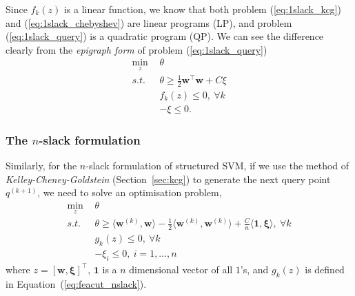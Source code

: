 \documentclass[9pt]{extarticle}
\begin{document}
Since $f_k(z)$ is a linear function, we know that both problem (\ref{eq:1slack_kcg}) and (\ref{eq:1slack_chebyshev}) are linear programs (LP),
and problem (\ref{eq:1slack_query}) is a quadratic program (QP). 
We can see the difference clearly from the \emph{epigraph form} of problem (\ref{eq:1slack_query}) 
\begin{align*}
\min_{z} ~& \theta \\
s.t.~~ ~& \theta \ge \frac{1}{2} \mathbf{w}^\top \mathbf{w} + C \xi \\
        & f_k(z) \le 0,~ \forall k \\
        & -\xi \le 0.
\end{align*}


\subsubsection{The $n$-slack formulation}
\label{sec:compare_nslack}

Similarly, for the $n$-slack formulation of structured SVM,
if we use the method of \emph{Kelley-Cheney-Goldstein} (Section~\ref{sec:kcg}) to generate the next query point $q^{(k+1)}$,
we need to solve an optimisation problem,
\begin{equation}
\label{eq:nslack_kcg}
\begin{aligned}
\min_{z} ~& \theta \\
s.t.~~ ~& \theta \ge \langle \mathbf{w}^{(k)}, \mathbf{w} \rangle - \frac{1}{2} \langle \mathbf{w}^{(k)}, \mathbf{w}^{(k)} \rangle + 
\frac{C}{n} \langle \mathbf{1}, \bm{\xi} \rangle,~ \forall k \\
        & g_k(z) \le 0,~ \forall k \\
        & -\xi_i \le 0,~ i = 1, \dots, n
\end{aligned}
\end{equation}
where $z = [\mathbf{w}, \bm{\xi}]^\top$, $\mathbf{1}$ is a $n$ dimensional vector of all $1$'s,
and $g_k(z)$ is defined in Equation~(\ref{eq:feacut_nslack}).
\end{document}
